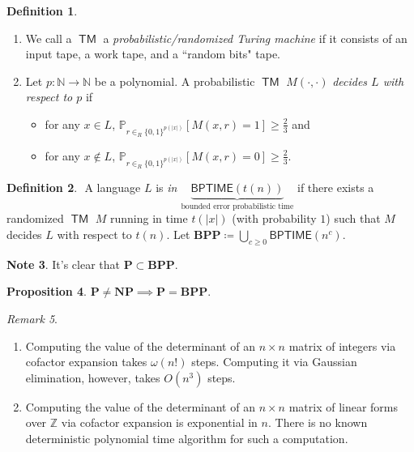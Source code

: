 \documentclass[10pt,letterpaper,cm]{nupset}
\theoremstyle{definition}
\newtheorem{definition}{Definition}[subsection]
\newtheorem{note}[definition]{Note}
\theoremstyle{theorem}
\newtheorem{prop}[definition]{Proposition}
\theoremstyle{remark}
\newtheorem{remark}[definition]{Remark}
\newcommand{\N}{\mathbb N}
\newcommand{\Z}{\mathbb Z}
\newcommand{\1}{\mathbf{1}}
\newcommand{\0}{\vec 0}
\DeclareMathOperator{\TM}{\mathsf{TM}}
\begin{document}
\begin{definition} $ $
\begin{enumerate}
\item We call a $\TM$ a \textit{probabilistic/randomized Turing machine} if it consists of an input tape, a work tape, and a ``random bits" tape.  
\item Let $p: \N \to \N$ be a polynomial. A probabilistic $\TM$ $M({\cdot}, {\cdot})$ \textit{decides $L$ with respect to $p$} if 
\begin{itemize}
\item for any $x\in L$, $\mathbb{P}_{r\in_R \{0,1\}^{p(\lvert{x}\rvert)}}[M(x,r)=1] \geq \frac{2}{3}$ and
\item for any $x\notin L$, $\mathbb{P}_{r\in_R \{0,1\}^{p(\lvert{x}\rvert)}}[M(x,r)=0] \geq \frac{2}{3}$.
\end{itemize}
\end{enumerate}
\end{definition}

\begin{definition} $ $
A language $L$ is \textit{in $\underbrace{\mathsf{BPTIME}(t(n))}_{\text{bounded error probabilistic time}}$} if there exists a randomized $\TM$ $M$ running in time $t(|x|)$ (with probability $1$) such that $M$ decides $L$ with respect to $t(n)$. Let $\mathbf{BPP} \coloneqq \bigcup_{c\geq 0} \mathsf{BPTIME}(n^c)$.
\end{definition}

\begin{note}
It's clear that $\mathbf{P} \subset \mathbf{BPP}$.
\end{note}

\begin{prop}
$\mathbf{P} \ne \mathbf{NP} \implies \mathbf{P} = \mathbf{BPP}$.
\end{prop}

\begin{remark} $ $
\begin{enumerate}
\item Computing the value of the determinant of an $n\times n$ matrix of integers via cofactor expansion takes $\omega(n!)$ steps. Computing it via Gaussian elimination, however, takes $O(n^3)$ steps. 
\item Computing the value of the determinant of an $n\times n$ matrix of linear forms over $\Z$ via cofactor expansion is exponential in $n$. There is no known deterministic polynomial time algorithm for such a computation.
\end{enumerate}
\end{remark}
\end{document}
